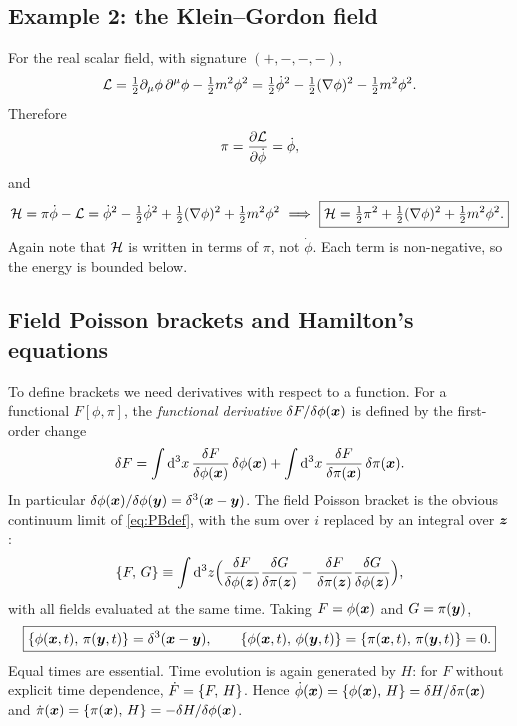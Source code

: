 \documentclass[11pt]{article}
\begin{document}
\subsection{Example 2: the Klein--Gordon field}

For the real scalar field, with signature $(+,-,-,-)$,
\begin{equation}
 \mathcal{L}=\tfrac12\partial_\mu\phi\,\partial^\mu\phi-\tfrac12m^2\phi^2=\tfrac12\dot\phi^2-\tfrac12(\nabla\phi)^2-\tfrac12m^2\phi^2 .
\end{equation}
Therefore
\begin{equation}
 \pi=\frac{\partial \mathcal{L}}{\partial \dot\phi}=\dot\phi,
\end{equation}
and
\begin{equation}
 \Ham=\pi\dot\phi-\Lag=\dot\phi^2-\tfrac12\dot\phi^2+\tfrac12(\nabla\phi)^2+\tfrac12m^2\phi^2
 \ \Longrightarrow\ \boxed{\Ham=\tfrac12\pi^2+\tfrac12(\nabla\phi)^2+\tfrac12m^2\phi^2 .}
\end{equation}
Again note that $\mathcal{H}$ is written in terms of $\pi$, not $\dot\phi$. Each term is non-negative, so the energy is bounded below.

\subsection{Field Poisson brackets and Hamilton's equations}

To define brackets we need derivatives with respect to a function. For a functional $F[\phi,\pi]$, the \emph{functional derivative} $\delta F/\delta\phi(\bm{x})$ is defined by the first-order change
\begin{equation}
 \delta F=\int\mathrm{d}^3x\,\frac{\delta F}{\delta \phi(\bm{x})}\,\delta\phi(\bm{x})+\int\mathrm{d}^3x\,\frac{\delta F}{\delta \pi(\bm{x})}\,\delta\pi(\bm{x}).
\end{equation}
In particular $\delta\phi(\bm{x})/\delta\phi(\bm{y})=\delta^3(\bm{x}-\bm{y})$. The field Poisson bracket is the obvious continuum limit of \eqref{eq:PBdef}, with the sum over $i$ replaced by an integral over $\bm{z}$:
\begin{equation}
 \left\{F,\,G\right\}\equiv\int\mathrm{d}^3z\Bigl(\frac{\delta F}{\delta \phi(\bm{z})}\frac{\delta G}{\delta \pi(\bm{z})}-\frac{\delta F}{\delta \pi(\bm{z})}\frac{\delta G}{\delta \phi(\bm{z})}\Bigr),
\end{equation}
with all fields evaluated at the same time. Taking $F=\phi(\bm{x})$ and $G=\pi(\bm{y})$,
\begin{equation}
 \boxed{\left\{\phi(\bm{x},t),\,\pi(\bm{y},t)\right\}=\delta^3(\bm{x}-\bm{y}),\qquad\left\{\phi(\bm{x},t),\,\phi(\bm{y},t)\right\}=\left\{\pi(\bm{x},t),\,\pi(\bm{y},t)\right\}=0 .}
\end{equation}
Equal times are essential. Time evolution is again generated by $H$: for $F$ without explicit time dependence, $\dot F=\left\{F,\,H\right\}$. Hence $\dot\phi(\bm{x})=\left\{\phi(\bm{x}),\,H\right\}=\delta H/\delta\pi(\bm{x})$ and $\dot\pi(\bm{x})=\left\{\pi(\bm{x}),\,H\right\}=-\delta H/\delta\phi(\bm{x})$.
\end{document}
